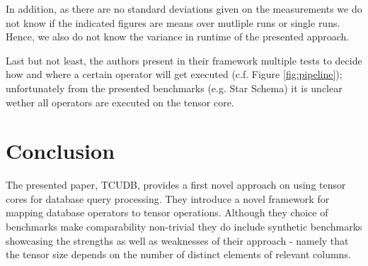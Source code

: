 \documentclass{paper}
\begin{document}
	In addition, as there are no standard deviations given on the measurements we do not know if the indicated figures are means over mutliple runs or single runs. Hence, we also do not know the variance in runtime of the presented approach. 
	
	Last but not least, the authors present in their framework multiple tests to decide how and where a certain operator will get executed (c.f. Figure \ref{fig:pipeline}); unfortunately from the presented benchmarks (e.g. Star Schema) it is unclear wether all operators are executed on the tensor core.
	
	
	\section{Conclusion}
	
	The presented paper, TCUDB, provides a first novel approach on using tensor cores for database query processing. They introduce a novel framework for mapping database operators to tensor operations. Although they choice of benchmarks make comparability non-trivial they do include synthetic benchmarks showcasing the strengths as well as weaknesses of their approach - namely that the tensor size depends on the number of distinct elements of relevant columns.
	


	
\end{document}
